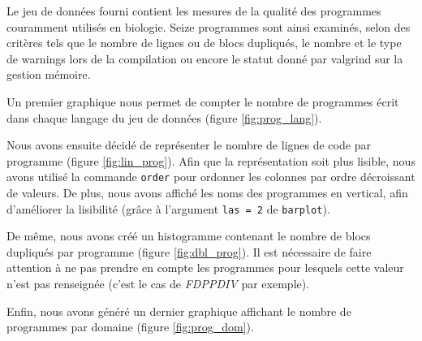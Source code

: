 Le jeu de données fourni contient les mesures de la qualité des
programmes couramment utilisés en biologie. Seize programmes
sont ainsi examinés, selon des critères tels que le nombre de lignes ou
de blocs dupliqués, le nombre et le type de warnings lors de la
compilation ou encore le statut donné par valgrind sur la gestion
mémoire.

Un premier graphique nous permet de compter le nombre de programmes
écrit dans chaque langage du jeu de données (figure \ref{fig:prog_lang}).

Nous avons ensuite décidé de représenter le nombre de lignes de code
par programme (figure \ref{fig:lin_prog}). Afin que la représentation
soit plus lisible, nous avons utilisé la commande \lstinline{order}
pour ordonner les colonnes par ordre décroissant de valeurs. De
plus, nous avons affiché les noms des programmes en vertical, afin
d'améliorer la lisibilité (grâce à l'argument \lstinline{las = 2} de
\lstinline{barplot}).

De même, nous avons créé un histogramme contenant le nombre de blocs
dupliqués par programme (figure \ref{fig:dbl_prog}). Il est nécessaire
de faire attention à ne pas prendre en compte les programmes pour
lesquels cette valeur n'est pas renseignée (c'est le cas de \emph{FDPPDIV}
par exemple).

Enfin, nous avons généré un dernier graphique affichant le nombre de
programmes par domaine (figure \ref{fig:prog_dom}).


